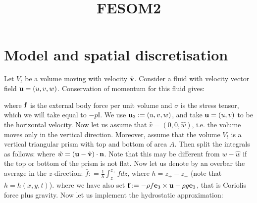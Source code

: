 \documentclass[10pt]{article}
\begin{document}
\title{FESOM2}
\date{}
\maketitle
\section{Model and spatial discretisation}
Let $V_{t}$ be a volume moving with velocity $\hat{\mathbf{v}}$. Consider a fluid with velocity vector field $\textbf{u} = (u,v,w)$. Conservation of momentum for this fluid gives:

where $\mathbf{f}$ is the external body force per unit volume and $\sigma$ is the stress tensor, which we will take equal to $-p\mathbb{I}$. We use $\mathbf{u}_{3} : = (u,v,w)$, and take $\mathbf{u} = (u,v)$ to be the horizontal velocity. Now let us assume that $\hat{v} = (0,0,\hat{w})$, i.e. the volume moves only in the vertical direction. Moreover, assume that the volume $V_{t}$ is a vertical triangular prism with top and bottom of area $A$. Then split the integrals as follows:
where $\tilde{w} = (\mathbf{u} - \hat{\mathbf{v}})\cdot\mathbf{n}$. Note that this may be different from $w-\hat{w}$ if the top or bottom of the prism is not flat. Now let us denote by an overbar the average in the $z$-direction: $\bar{f} : = \tfrac{1}{h}\int_{z_{-}}^{z_{+}} f dz$, where $h = z_{+} - z_{-}$ (note that $h = h(x,y,t)$). 
where we have also set $\textbf{f} := -\rho f\mathbf{e}_{3}\times \mathbf{u} - \rho g \mathbf{e}_{3}$, that is Coriolis force plus gravity. Now let us implement the hydrostatic approximation:
\end{document}
